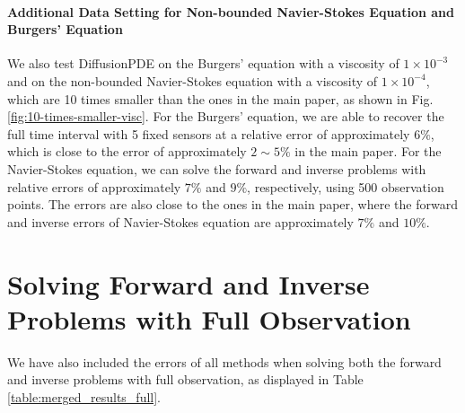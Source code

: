 \vspace{-1.0em}
\paragraph{Additional Data Setting for Non-bounded Navier-Stokes Equation and Burgers’ Equation}

We also test DiffusionPDE on the Burgers’ equation with a viscosity of $1\times 10^{-3}$ and on the non-bounded Navier-Stokes equation with a viscosity of $1\times 10^{-4}$, which are 10 times smaller than the ones in the main paper, as shown in Fig. \ref{fig:10-times-smaller-visc}. For the Burgers’ equation, we are able to recover the full time interval with 5 fixed sensors at a relative error of approximately $6\%$, which is close to the error of approximately $2\sim 5\%$ in the main paper. For the Navier-Stokes equation, we can solve the forward and inverse problems with relative errors of approximately $7\%$ and $9\%$, respectively, using 500 observation points. The errors are also close to the ones in the main paper, where the forward and inverse errors of Navier-Stokes equation are approximately $7\%$ and $10\%$.


\vspace{-0.3em}
\section{Solving Forward and Inverse Problems with Full Observation}\label{sec:all-full}
\vspace{-0.2em}

We have also included the errors of all methods when solving both the forward and inverse problems with full observation, as displayed in Table \ref{table:merged_results_full}.


